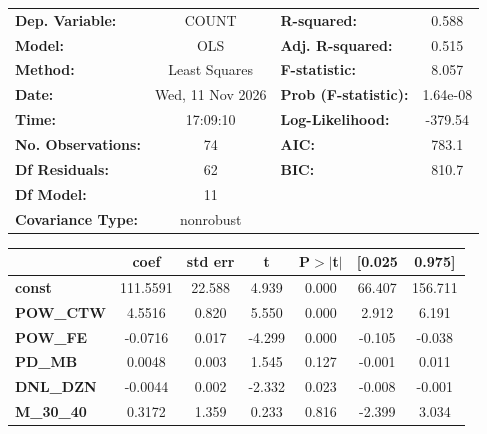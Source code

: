 \begin{center}
\begin{tabular}{lclc}
\toprule
\textbf{Dep. Variable:}    &      COUNT       & \textbf{  R-squared:         } &     0.588   \\
\textbf{Model:}            &       OLS        & \textbf{  Adj. R-squared:    } &     0.515   \\
\textbf{Method:}           &  Least Squares   & \textbf{  F-statistic:       } &     8.057   \\
\textbf{Date:}             & Wed, 11 Nov 2026 & \textbf{  Prob (F-statistic):} &  1.64e-08   \\
\textbf{Time:}             &     17:09:10     & \textbf{  Log-Likelihood:    } &   -379.54   \\
\textbf{No. Observations:} &          74      & \textbf{  AIC:               } &     783.1   \\
\textbf{Df Residuals:}     &          62      & \textbf{  BIC:               } &     810.7   \\
\textbf{Df Model:}         &          11      & \textbf{                     } &             \\
\textbf{Covariance Type:}  &    nonrobust     & \textbf{                     } &             \\
\bottomrule
\end{tabular}
\begin{tabular}{lcccccc}
                   & \textbf{coef} & \textbf{std err} & \textbf{t} & \textbf{P$> |$t$|$} & \textbf{[0.025} & \textbf{0.975]}  \\
\midrule
\textbf{const}     &     111.5591  &       22.588     &     4.939  &         0.000        &       66.407    &      156.711     \\
\textbf{POW\_CTW}  &       4.5516  &        0.820     &     5.550  &         0.000        &        2.912    &        6.191     \\
\textbf{POW\_FE}   &      -0.0716  &        0.017     &    -4.299  &         0.000        &       -0.105    &       -0.038     \\
\textbf{PD\_MB}    &       0.0048  &        0.003     &     1.545  &         0.127        &       -0.001    &        0.011     \\
\textbf{DNL\_DZN}  &      -0.0044  &        0.002     &    -2.332  &         0.023        &       -0.008    &       -0.001     \\
\textbf{M\_30\_40} &       0.3172  &        1.359     &     0.233  &         0.816        &       -2.399    &        3.034     \\

\end{tabular}
\end{center}
